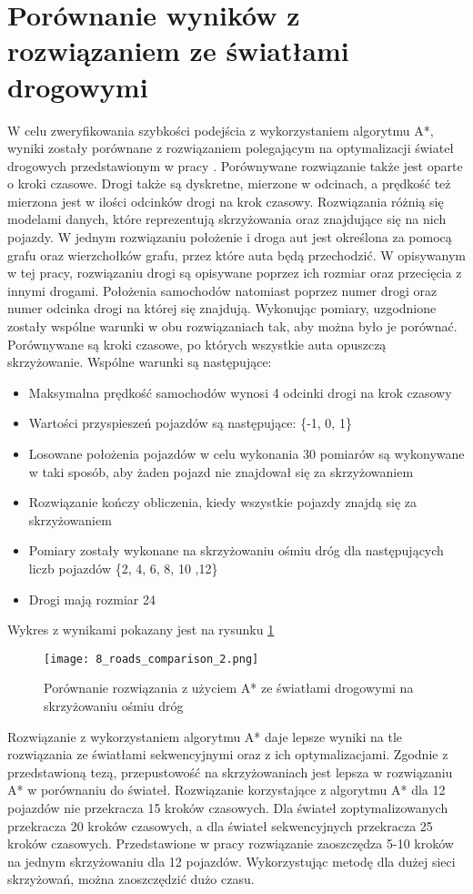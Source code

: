 \section{Porównanie wyników z rozwiązaniem ze światłami drogowymi}

W celu zweryfikowania szybkości podejścia z wykorzystaniem algorytmu A*, wyniki zostały porównane z rozwiązaniem polegającym na optymalizacji świateł drogowych przedstawionym w pracy \cite{slakomy}. Porównywane rozwiązanie także jest oparte o kroki czasowe. Drogi także są dyskretne, mierzone w odcinach, a prędkość też mierzona jest w ilości odcinków drogi na krok czasowy.
\newline
\indent
Rozwiązania różnią się modelami danych, które reprezentują skrzyżowania oraz znajdujące się na nich pojazdy. W jednym rozwiązaniu położenie i droga aut jest określona za pomocą grafu oraz wierzchołków grafu, przez które auta będą przechodzić. W opisywanym w tej pracy, rozwiązaniu drogi są opisywane poprzez ich rozmiar oraz przecięcia z innymi drogami. Położenia samochodów natomiast poprzez numer drogi oraz numer odcinka drogi na której się znajdują.
\newline
\indent
Wykonując pomiary, uzgodnione zostały wspólne warunki w obu rozwiązaniach tak, aby można było je porównać. Porównywane są kroki czasowe, po których wszystkie auta opuszczą skrzyżowanie. Wspólne warunki są następujące:
\begin{itemize}
\item Maksymalna prędkość samochodów wynosi 4 odcinki drogi na krok czasowy
\item Wartości przyspieszeń pojazdów są następujące: \{-1, 0, 1\}
\item Losowane położenia pojazdów w celu wykonania 30 pomiarów są wykonywane w taki sposób, aby żaden pojazd nie znajdował się za skrzyżowaniem
\item Rozwiązanie kończy obliczenia, kiedy wszystkie pojazdy znajdą się za skrzyżowaniem
\item Pomiary zostały wykonane na skrzyżowaniu ośmiu dróg dla następujących liczb pojazdów \{2, 4, 6, 8, 10 ,12\}
\item Drogi mają rozmiar 24
\end{itemize}
Wykres z wynikami pokazany jest na rysunku \ref{comparison}
\begin{figure}[H]
  \texttt{[image: 8\_roads\_comparison\_2.png]}
  \caption{Porównanie rozwiązania z użyciem A* ze światłami drogowymi na skrzyżowaniu ośmiu dróg}
  \label{comparison}
\end{figure}
Rozwiązanie z wykorzystaniem algorytmu A* daje lepsze wyniki na tle rozwiązania ze światłami sekwencyjnymi oraz z ich optymalizacjami. Zgodnie z przedstawioną tezą, przepustowość na skrzyżowaniach jest lepsza w rozwiązaniu A* w porównaniu do świateł. Rozwiązanie korzystające z algorytmu A* dla 12 pojazdów nie przekracza 15 kroków czasowych. Dla świateł zoptymalizowanych przekracza 20 kroków czasowych, a dla świateł sekwencyjnych przekracza 25 kroków czasowych. Przedstawione w pracy rozwiązanie zaoszczędza 5-10 kroków na jednym skrzyżowaniu dla 12 pojazdów. Wykorzystując metodę dla dużej sieci skrzyżowań, można zaoszczędzić dużo czasu.
